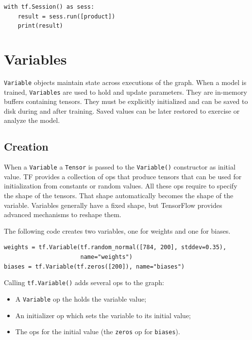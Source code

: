 \begin{lstlisting}
with tf.Session() as sess:
    result = sess.run([product])
    print(result)
\end{lstlisting}

\section{Variables}

\lstinline|Variable| objects maintain state across executions of the graph. When a model is trained, \lstinline|Variables| are used to hold and update parameters. They are in-memory buffers containing tensors. They must be explicitly initialized and can be saved to disk during and after training. Saved values can be later restored to exercise or analyze the model.

\subsection{Creation}

When a \lstinline|Variable| a \lstinline|Tensor| is passed to the \lstinline|Variable()| constructor as initial value. \acs{TF} provides a collection of ops that produce tensors that can be used for initialization from constants or random values. All these ops require to specify the shape of the tensors. That shape automatically becomes the shape of the variable. Variables generally have a fixed shape, but TensorFlow provides advanced mechanisms to reshape them.

The following code creates two variables, one for weights and one for biases.

\begin{lstlisting}
weights = tf.Variable(tf.random_normal([784, 200], stddev=0.35),
                      name="weights")
biases = tf.Variable(tf.zeros([200]), name="biases")
\end{lstlisting}

Calling \lstinline|tf.Variable()| adds several ops to the graph:

\begin{itemize}
	\item A \lstinline|Variable| op the holds the variable value;
	\item An initializer op which sets the variable to its initial value;
	\item The ops for the initial value (\eg the \lstinline|zeros| op for \lstinline|biases|).
\end{itemize}

